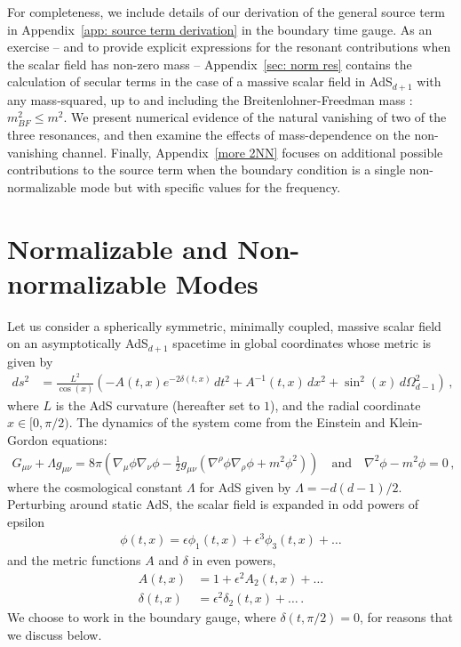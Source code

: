 \documentclass[letterpaper,11pt]{article}
\begin{document}
For completeness, we include details of our derivation of the general source term in Appendix~\ref{app: source term derivation} in the boundary time gauge. As an exercise -- and to provide explicit expressions for the resonant contributions when the scalar field has non-zero mass -- Appendix~\ref{sec: norm res} contains the calculation of secular terms in the case of a massive scalar field in AdS$_{d+1}$ with any mass-squared, up to and including the Breitenlohner-Freedman mass \cite{Breitenlohner:1982bm}: $m^2_{BF} \leq m^2$. We present numerical evidence of the natural vanishing of two of the three resonances, and then examine the effects of mass-dependence on the non-vanishing channel. Finally, Appendix~\ref{more 2NN} focuses on additional possible contributions to the source term when the boundary condition is a single non-normalizable mode but with specific values for the frequency.


\section{Normalizable and Non-normalizable Modes}
\label{sec: source terms and BCs}

Let us consider a spherically symmetric, minimally coupled, massive scalar field on an asymptotically AdS$_{d+1}$ spacetime in global coordinates whose metric is given by
\begin{align}
\label{AdS metric}
ds^2 &= \frac{L^2}{\cos(x)} \left( - A(t,x) e^{-2 \delta(t,x)} \, dt^2 + A^{-1}(t, x) \, dx^2 + \sin^2 (x) \, d\Omega^2_{d-1} \right) \, ,
\end{align}
where $L$ is the AdS curvature (hereafter set to $1$), and the radial coordinate $x \in [0, \pi/2)$. The dynamics of the system come from the Einstein and Klein-Gordon equations:
\begin{align}
G_{\mu \nu} + \Lambda g_{\mu \nu} = 8 \pi \left( \nabla_\mu \phi \nabla_\nu \phi - \frac{1}{2} g_{\mu \nu} \left( \nabla^\rho \phi \nabla_\rho \phi + m^2 \phi^2 \right) \right) \quad \text{and} \quad \nabla^2 \phi - m^2 \phi = 0 \, ,
\end{align}
where the cosmological constant $\Lambda$ for AdS given by $\Lambda = -d(d-1)/2$. Perturbing around static AdS, the scalar field is expanded in odd powers of epsilon 
\begin{align}
\phi(t,x) = \epsilon \phi_1(t,x) + \epsilon^3 \phi_3 (t,x) + \ldots
\end{align}
and the metric functions $A$ and $\delta$ in even powers,
\begin{align}
A(t, x) &= 1 + \epsilon^2 A_2 (t,x) + \ldots \\
\delta(t, x) &= \epsilon^2 \delta_2 (t,x)+ \ldots \, .
\end{align}
We choose to work in the boundary gauge, where $\delta(t, \pi/2) = 0$, for reasons that we discuss below.
\end{document}
